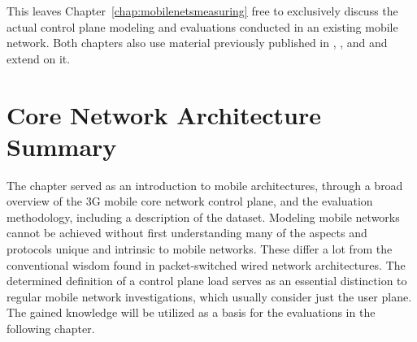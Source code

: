 This leaves Chapter~\ref{chap:mobilenetsmeasuring} free to exclusively discuss the actual control plane modeling and evaluations conducted in an existing mobile network. Both chapters also use material previously published in \cite{metzger2012research}, \cite{metzger2014jcnc}, and \cite{metzger2014lossmodel} and extend on it.














\section{Core Network Architecture Summary}
\label{c41:sec:conclusion}

The chapter served as an introduction to mobile architectures, through a broad overview of the \gls{3G} mobile core network control plane, and the evaluation methodology, including a description of the dataset. Modeling mobile networks cannot be achieved without first understanding many of the aspects and protocols unique and intrinsic to mobile networks. These differ a lot from the conventional wisdom found in packet-switched wired network architectures. The determined definition of a control plane load serves as an essential distinction to regular mobile network investigations, which usually consider just the user plane. The gained knowledge will be utilized as a basis for the evaluations in the following chapter.


